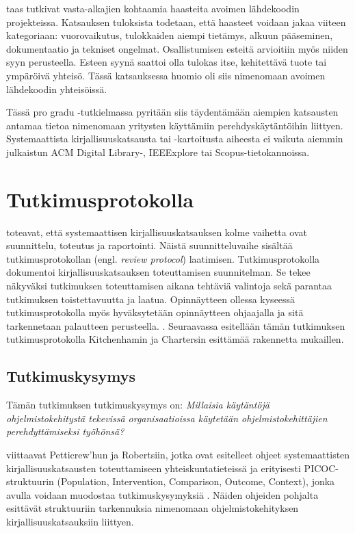 \documentclass[utf8]{gradu3}
\begin{document}
\textcite{steinmacher-ym-2015} taas tutkivat vasta-alkajien kohtaamia haasteita avoimen lähdekoodin projekteissa. Katsauksen tuloksista todetaan, että haasteet voidaan jakaa viiteen kategoriaan: vuorovaikutus, tulokkaiden aiempi tietämys, alkuun pääseminen, dokumentaatio ja tekniset ongelmat.  Osallistumisen esteitä arvioitiin myös niiden syyn perusteella. Esteen syynä saattoi olla tulokas itse, kehitettävä tuote tai ympäröivä yhteisö. Tässä katsauksessa huomio oli siis nimenomaan avoimen lähdekoodin yhteisöissä.

Tässä pro gradu -tutkielmassa pyritään siis täydentämään aiempien katsausten antamaa tietoa nimenomaan yritysten käyttämiin perehdyskäytäntöihin liittyen. Systemaattista kirjallisuuskatsausta tai -kartoitusta aiheesta ei vaikuta aiemmin julkaistun ACM Digital Library-, IEEExplore tai Scopus-tietokannoissa. 

\chapter{Tutkimusprotokolla}
\label{paaluku-protokolla}

\textcite{kitchenham-charters-2007} toteavat, että systemaattisen kirjallisuuskatsauksen kolme vaihetta ovat suunnittelu, toteutus ja raportointi. Näistä suunnitteluvaihe sisältää tutkimusprotokollan (engl. \textit{review protocol}) laatimisen. Tutkimusprotokolla dokumentoi kirjallisuuskatsauksen toteuttamisen suunnitelman. Se tekee näkyväksi tutkimuksen toteuttamisen aikana tehtäviä valintoja sekä parantaa tutkimuksen toistettavuutta ja laatua. Opinnäytteen ollessa kyseessä tutkimusprotokolla myös hyväksytetään opinnäytteen ohjaajalla ja sitä tarkennetaan palautteen perusteella. \parencite{kitchenham-charters-2007}. Seuraavassa esitellään tämän tutkimuksen tutkimusprotokolla Kitchenhamin ja Chartersin esittämää rakennetta mukaillen.

\section{Tutkimuskysymys}
\label{luku:tutkimuskysymys}

Tämän tutkimuksen tutkimuskysymys on: \textit{Millaisia käytäntöjä ohjelmistokehitystä tekevissä organisaatioissa käytetään ohjelmistokehittäjien perehdyttämiseksi työhönsä?}

\textcite{kitchenham-charters-2007} viittaavat Petticrew'hun ja Robertsiin, jotka ovat esitelleet ohjeet systemaattisten kirjallisuuskatsausten toteuttamiseen yhteiskuntatieteissä ja erityisesti PICOC-struktuurin (Population, Intervention, Comparison, Outcome, Context), jonka avulla voidaan muodostaa tutkimuskysymyksiä \parencite{petticrew-roberts-2006}. Näiden ohjeiden pohjalta \textcite{kitchenham-charters-2007} esittävät struktuuriin tarkennuksia nimenomaan ohjelmistokehityksen kirjallisuuskatsauksiin liittyen. 
\end{document}
